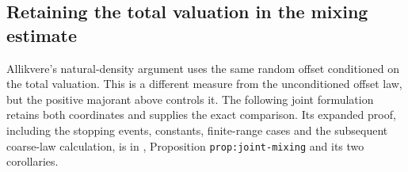 \subsection{Retaining the total valuation in the mixing estimate}
\label{subsec:Tao-joint-total-mixing}

Allikvere's natural-density argument \cite[Section~4]{Allikvere2026v2}
uses the same random offset conditioned on the total valuation. This is a
different measure from the unconditioned offset law, but the positive
majorant above controls it. The following joint formulation retains both
coordinates and supplies the exact comparison. Its expanded proof,
including the stopping events, constants, finite-range cases and the
subsequent coarse-law calculation, is in
,
Proposition \texttt{prop:joint-mixing} and its two corollaries.

